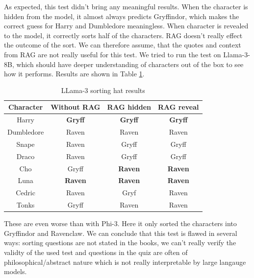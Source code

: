 \documentclass[fleqn,moreauthors,10pt]{ds_report}
\begin{document}
As expected, this test didn't bring any meaningful results.
When the character is hidden from the model, it almost always predicts Gryffindor, which makes the correct guess for Harry and Dumbledore meaningless.
When character is revealed to the model, it correctly sorts half of the characters. RAG doesn't really effect the outcome of the sort.
We can therefore assume, that the quotes and context from RAG are not really useful for this test.
We tried to run the test on Llama-3-8B, which should have deeper understanding of characters out of the box to see how it performs.
Results are shown in Table \ref*{tab:sorting_hat_results_llama}.

\begin{table}[hbt]
	\caption{LLama-3 sorting hat results}
	\centering
	\begin{tabular}{c | c | c | c }
		Character  & Without RAG    & RAG hidden     & RAG reveal     \\ \hline
		Harry      & \textbf{Gryff} & \textbf{Gryff} & \textbf{Gryff} \\
		Dumbledore & Raven          & Raven          & Raven          \\ \hline
		Snape      & Raven          & Gryff          & Gryff          \\
		Draco      & Raven          & Gryff          & Gryff          \\ \hline
		Cho        & Gryff          & \textbf{Raven} & \textbf{Raven} \\
		Luna       & \textbf{Raven} & \textbf{Raven} & \textbf{Raven} \\ \hline
		Cedric     & Raven          & Gryf           & Raven          \\
		Tonks      & Gryff          & Raven          & Raven          \\
	\end{tabular}
	\label{tab:sorting_hat_results_llama}
\end{table}

These are even worse than with Phi-3. Here it only sorted the characters into Gryffindor and Ravenclaw.
We can conclude that this test is flawed in several ways: sorting questions are not stated in the books,
we can't really verify the validty of the used test
and questions in the quiz are often of philosophical/abstract nature which is not really interpretable by large langauge models.



\end{document}
